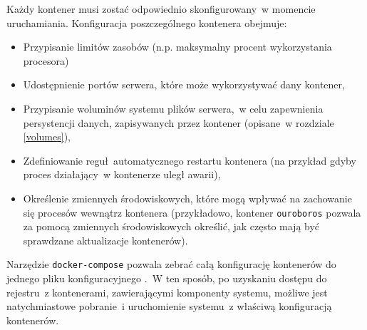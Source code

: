 \noindent
Każdy kontener musi zostać odpowiednio skonfigurowany~w momencie uruchamiania.
Konfiguracja poszczególnego kontenera obejmuje:

\begin{itemize}
  \item Przypisanie limitów zasobów (n.p. maksymalny procent wykorzystania procesora)
  \item Udostępnienie portów serwera, które może wykorzystywać dany kontener,
  \item Przypisanie woluminów systemu plików serwera,~w celu zapewnienia persystencji
        danych, zapisywanych przez kontener (opisane~w rozdziale \ref{volumes}),
  \item Zdefiniowanie reguł automatycznego restartu kontenera (na przykład gdyby proces
        działający~w kontenerze uległ awarii),
  \item Określenie zmiennych środowiskowych, które mogą wpływać na zachowanie się
        procesów wewnątrz kontenera (przykładowo, kontener \texttt{ouroboros} pozwala
        za pomocą zmiennych środowiskowych określić, jak często mają być sprawdzane
        aktualizacje kontenerów).
\end{itemize}

Narzędzie \texttt{docker-compose} pozwala zebrać całą konfigurację kontenerów do 
jednego pliku konfiguracyjnego \cite{docker_compose}.~W ten sposób, po uzyskaniu
dostępu do rejestru~z kontenerami, zawierającymi komponenty systemu, możliwe jest
natychmiastowe pobranie~i uruchomienie systemu~z właściwą konfiguracją kontenerów.

